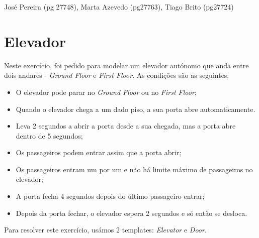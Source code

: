 \documentclass[12pt]{article} %
\begin{document}
José Pereira (pg 27748), Marta Azevedo (pg27763), Tiago Brito (pg27724)

\section{Elevador} %

Neste exercício, foi pedido para modelar um elevador autónomo que anda entre dois andares - {\it{Ground Floor}} e {\it{First Floor}}. As condições são as seguintes:
\begin{itemize}
\item O elevador pode parar no {\it{Ground Floor}} ou no {\it{First Floor}};
\item Quando o elevador chega a um dado piso, a sua porta abre automaticamente.
\item Leva 2 segundos a abrir a porta desde a sua chegada, mas a porta abre dentro de 5 segundos;
\item Os passageiros podem entrar assim que a porta abrir;
\item Os passageiros entram um por um e não há limite máximo de passageiros no elevador;
\item A porta fecha 4 segundos depois do último passageiro entrar;
\item Depois da porta fechar, o elevador espera 2 segundos e só então se desloca.
\end{itemize}

Para resolver este exercício, usámos 2 templates: {\it{Elevator}} e {\it{Door}}. 
\\
\end{document}
